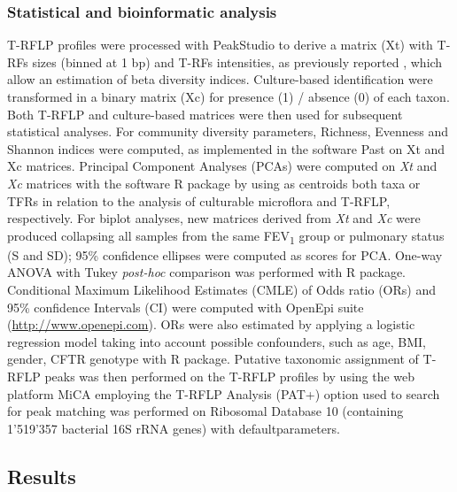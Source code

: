 \subsubsection{Statistical and bioinformatic analysis}
T-RFLP profiles were processed with PeakStudio \cite{mccafferty2012peak} to derive a matrix (Xt) with T-RFs sizes (binned at {\textpm}1 bp) and T-RFs intensities, as previously reported \cite{pastorelli2011effects, bacci2014composition}, which allow an estimation of beta diversity indices. Culture-based identification were transformed in a binary matrix (Xc) for presence (1) / absence (0) of each taxon. Both T-RFLP and culture-based matrices were then used for subsequent statistical analyses. For community diversity parameters, Richness, Evenness and Shannon indices were computed, as implemented in the software Past \cite{hammer2001past} on Xt and Xc matrices. Principal Component Analyses (PCAs) were computed on \textit{Xt} and \textit{Xc} matrices with the software R package by using as centroids both taxa or TFRs in relation to the analysis of culturable microflora and T-RFLP, respectively. For biplot analyses, new matrices derived from \textit{Xt} and \textit{Xc} were produced collapsing all samples from the same FEV\textsubscript{1} group or pulmonary status (S and SD); 95\% confidence ellipses were computed as scores for PCA. One-way ANOVA with Tukey \textit{post-hoc} comparison was performed with R package.\\ 
Conditional Maximum Likelihood Estimates (CMLE) of Odds ratio (ORs) and 95\% confidence Intervals (CI) were computed with OpenEpi suite (\href{http://www.openepi.com/}{http://\-www.\-openepi\-.com}). ORs were also estimated by applying a logistic regression model taking into account possible confounders, such as age, BMI, gender, CFTR genotype with R package. Putative taxonomic assignment of T-RFLP peaks was then performed on the T-RFLP profiles by using the web platform MiCA \cite{shyu2007mica} employing the T-RFLP Analysis (PAT+) option used to search for peak matching was performed on Ribosomal Database 10 (containing 1'519'357 bacterial 16S rRNA genes) with defaultparameters.\\

\subsection{Results}

